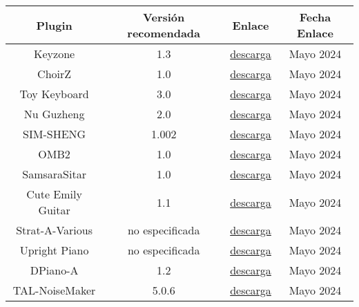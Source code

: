 \begin{table}[h]
    \centering
	\begin{tabular}{c|c|c|c}
		\textbf{Plugin} & \textbf{Versión recomendada} & \textbf{Enlace} & \textbf{Fecha Enlace} \\
		\hline\hline
		
            Keyzone  & 1.3 & \href{https://plugins4free.com/plugin/1990/}{descarga} & Mayo 2024\\
            
            ChoirZ  & 1.0 & \href{https://plugins4free.com/plugin/1086/}{descarga} & Mayo 2024\\
            
            Toy Keyboard  & 3.0 & \href{https://www.samplescience.info/2020/12/toy-keyboard.html}{descarga} & Mayo 2024\\

            Nu Guzheng  & 2.0 & \href{https://www.samplescience.info/2021/05/nu-guzheng.html}{descarga} & Mayo 2024\\
            
            SIM-SHENG  & 1.002 & \href{https://plugins4free.com/plugin/3668/}{descarga} & Mayo 2024\\
            
            OMB2  & 1.0 & \href{https://plugins4free.com/plugin/2493/}{descarga} & Mayo 2024\\
            
            SamsaraSitar  & 1.0 & \href{https://plugins4free.com/plugin/2489/}{descarga} & Mayo 2024\\
            Cute Emily Guitar  & 1.1 & \href{https://plugins4free.com/plugin/2315/}{descarga} & Mayo 2024\\
            
            Strat-A-Various  & no especificada & \href{https://plugins4free.com/plugin/360/}{descarga} & Mayo 2024\\
            
            Upright Piano & no especificada & \href{https://audiolatry.com/products/upright-piano}{descarga} & Mayo 2024\\
            
            DPiano-A & 1.2 & \href{https://plugins4free.com/plugin/2812/}{descarga} & Mayo 2024\\

            TAL-NoiseMaker & 5.0.6 & \href{https://tal-software.com/products/tal-noisemaker}{descarga} & Mayo 2024\\
            

\end{tabular}
\end{table}
